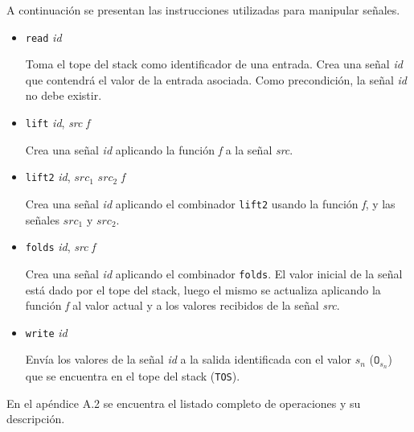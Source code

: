   A continuación se presentan las instrucciones utilizadas para manipular
señales.
  \begin{itemize}

\item {
    \texttt{read} \textit{id}

      Toma el tope del stack como identificador de una entrada.
      Crea una señal \textit{id} que contendrá el valor de la entrada
    asociada. 
      Como precondición, la señal \textit{id} no debe existir.

    
}
\item {
    \texttt{lift} \textit{id}, \textit{src} \textit{f}

      Crea una señal \textit{id} aplicando la función \textit{f}
    a la señal \textit{src}.
  
    
}
\item {
  \texttt{lift2} \textit{id}, $\textit{src}_1$ $\textit{src}_2$ \textit{f}

      Crea una señal \textit{id} aplicando el combinador \texttt{lift2}
    usando la función \textit{f}, y las señales $\textit{src}_1$ y
  $\textit{src}_2$.

    
}
\item {
    \texttt{folds} \textit{id}, \textit{src} \textit{f}

      Crea una señal \textit{id} aplicando el combinador \texttt{folds}.
    El valor inicial de la señal está dado por el tope del stack, luego
    el mismo se actualiza aplicando la función \textit{f} al valor actual
    y a los valores recibidos de la señal \textit{src}.

    
}
\item {
    \texttt{write} \textit{id}

    Envía los valores de la señal \textit{id} a la salida identificada
     con el valor $s_n$ ($\texttt{O}_{s_n}$) que se encuentra en el
     tope del stack (\texttt{TOS}).
    
    
}
\end{itemize}

  En el apéndice A.2 se encuentra el listado completo de operaciones y su
descripción.

